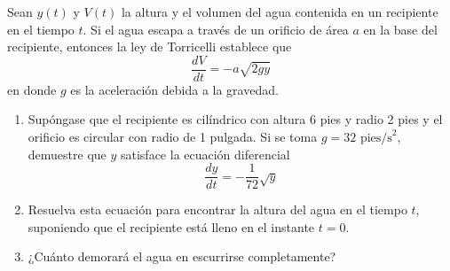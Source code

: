 \item Sean $y(t)$ y $V(t)$ la altura y el volumen del agua contenida en un recipiente en el tiempo $t$. Si el agua escapa a través de un orificio de área $a$ en la base del recipiente, entonces la ley de Torricelli establece que
    \[ \frac{dV}{dt} = -a \sqrt{2gy} \]
    en donde $g$ es la aceleración debida a la gravedad.
    \begin{enumerate}
        \item[(a)] Supóngase que el recipiente es cilíndrico con altura 6 pies y radio 2 pies y el orificio es circular con radio de 1 pulgada. Si se toma $g = 32 \text{ pies/s}^2$, demuestre que $y$ satisface la ecuación diferencial
        \[ \frac{dy}{dt} = -\frac{1}{72} \sqrt{y} \]
        \item[(b)] Resuelva esta ecuación para encontrar la altura del agua en el tiempo $t$, suponiendo que el recipiente está lleno en el instante $t = 0$.
        \item[(c)] ¿Cuánto demorará el agua en escurrirse completamente?
    \end{enumerate}
